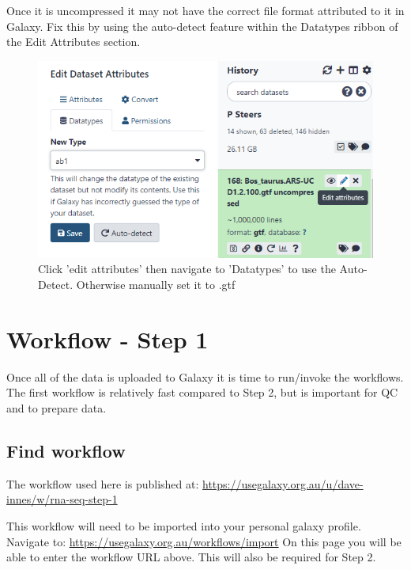 \documentclass[
]{book}
\begin{document}
Once it is uncompressed it may not have the correct file format attributed to it in Galaxy. Fix this by using the auto-detect feature within the Datatypes ribbon of the Edit Attributes section.

\begin{figure}

{\centering \includegraphics[width=1\linewidth]{images/image_edit_attributes} 

}

\caption{Click 'edit attributes' then navigate to 'Datatypes' to use the Auto-Detect. Otherwise manually set it to .gtf}\label{fig:edit-attributes}
\end{figure}

\hypertarget{step1}{%
\chapter{Workflow - Step 1}\label{step1}}

Once all of the data is uploaded to Galaxy it is time to run/invoke the workflows.
The first workflow is relatively fast compared to Step 2, but is important for QC and to prepare data.

\hypertarget{find-workflow}{%
\section{Find workflow}\label{find-workflow}}

The workflow used here is published at: \url{https://usegalaxy.org.au/u/dave-innes/w/rna-seq-step-1}

This workflow will need to be imported into your personal galaxy profile. Navigate to: \url{https://usegalaxy.org.au/workflows/import}
On this page you will be able to enter the workflow URL above. This will also be required for Step 2.
\end{document}
